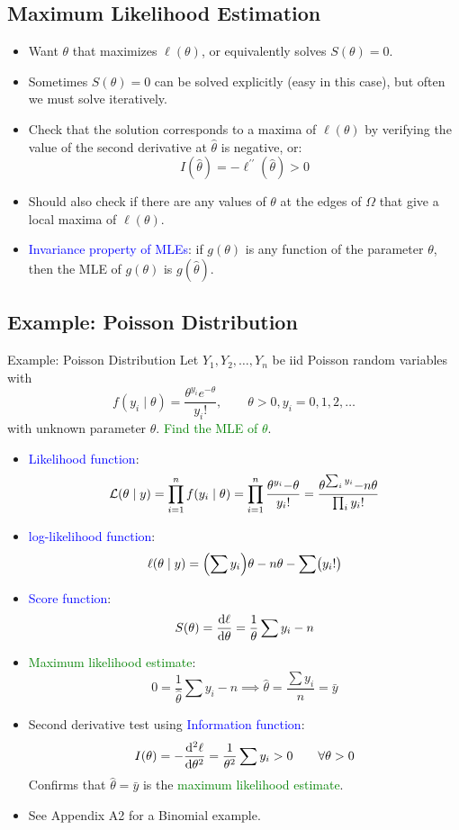 \documentclass[oneside]{book}\usepackage[]{graphicx}\usepackage[svgnames]{xcolor}
\let\exp\relax%
\let\log\relax%
\begin{document}
\subsection*{Maximum Likelihood Estimation}
\begin{itemize}
      \item Want $ \theta $ that maximizes $ \ell(\theta) $, or equivalently solves $ S(\theta)=0 $.
      \item Sometimes $ S(\theta)=0 $ can be solved explicitly (easy in this case), but often we must solve iteratively.
      \item Check that the solution corresponds to a maxima of $ \ell(\theta) $ by verifying the value of
            the second derivative at $ \hat{\theta} $ is negative, or:
            \[ I(\hat{\theta})=-\ell^{\prime\prime}(\hat{\theta})>0 \]
      \item Should also check if there are any values of $ \theta $ at the edges of $ \Omega $ that give
            a local maxima of $ \ell(\theta) $.
      \item \textcolor{Blue}{Invariance property of MLEs}: if $ g(\theta) $ is any function of the parameter
            $ \theta $, then the MLE of $ g(\theta) $ is $ g(\hat{\theta}) $.
\end{itemize}
\subsection*{Example: Poisson Distribution}
\begin{Example}{Example: Poisson Distribution}
      Let $ Y_1,Y_2,\ldots,Y_n $ be iid Poisson random variables with
      \[ f(y_i\mid \theta)=\frac{\theta^{y_i}e^{-\theta}}{y_i!},\qquad \theta>0,y_i=0,1,2,\ldots \]
      with unknown parameter $ \theta $. \textcolor{Green}{Find the MLE of $ \theta $}.
\end{Example}
\begin{itemize}
      \item \textcolor{Blue}{Likelihood function}:
            \[ \mathcal{L}(\theta\mid y)=\prod_{i=1}^n f(y_i\mid \theta)=\prod_{i=1}^n \frac{\theta^{y_i}\exp{-\theta}}{y_i!}=\frac{\theta^{\sum_i y_i}\exp{-n\theta}}{\prod_{i}y_i!}  \]
      \item \textcolor{Blue}{log-likelihood function}:
            \[ \ell(\theta\mid y)=\Bigl(\sum y_i \Bigr)\log{\theta}-n\theta-\sum\bigl(\log{y_i!}\bigr)  \]
      \item \textcolor{Blue}{Score function}:
            \[ S(\theta)=\odv{\ell}{\theta}=\frac{1}{\theta}\sum y_i-n \]
      \item \textcolor{Green}{Maximum likelihood estimate}:
            \[ 0=\frac{1}{\hat{\theta}}\sum y_i-n\implies \hat{\theta}=\frac{\sum y_i}{n}=\bar{y}  \]
      \item Second derivative test using \textcolor{Blue}{Information function}:
            \[ I(\theta)=-\odv[order=2]{\ell}{\theta}=\frac{1}{\theta^2}\sum y_i>0\qquad\forall \theta>0  \]
            Confirms that $ \hat{\theta}=\bar{y} $ is the \textcolor{Green}{maximum likelihood estimate}.
      \item See Appendix A2 for a Binomial example.
\end{itemize}
\end{document}
